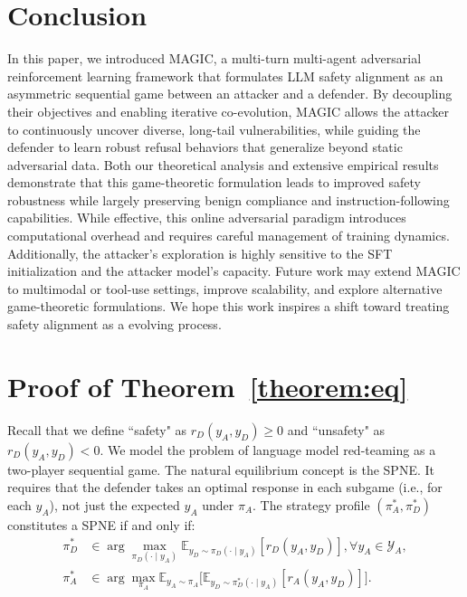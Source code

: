 \documentclass[11pt, letterpaper]{template}
\theoremstyle{plain}
\theoremstyle{definition}
\theoremstyle{remark}
\begin{document}
\section{Conclusion}
In this paper, we introduced MAGIC, a multi-turn multi-agent adversarial reinforcement learning framework that formulates LLM safety alignment as an asymmetric sequential game between an attacker and a defender. By decoupling their objectives and enabling iterative co-evolution, MAGIC allows the attacker to continuously uncover diverse, long-tail vulnerabilities, while guiding the defender to learn robust refusal behaviors that generalize beyond static adversarial data. Both our theoretical analysis and extensive empirical results demonstrate that this game-theoretic formulation leads to improved safety robustness while largely preserving benign compliance and instruction-following capabilities. While effective, this online adversarial paradigm introduces computational overhead and requires careful management of training dynamics. Additionally, the attacker’s exploration is highly sensitive to the SFT initialization and the attacker model’s capacity. Future work may extend MAGIC to multimodal or tool-use settings, improve scalability, and explore alternative game-theoretic formulations. We hope this work inspires a shift toward treating safety alignment as a evolving process.



\newpage
\appendix
\section{Proof of Theorem~\ref{theorem:eq}} \label{apd:proof_theorem1}

Recall that we define ``safety" as $r_D(y_A,y_D) \geq 0$ and ``unsafety" as $r_D(y_A,y_D) < 0$. We model the problem of language model red-teaming as a two-player sequential game. The  natural equilibrium concept is the SPNE. It requires that the defender takes an optimal response in each subgame (i.e., for each $y_A$), not just the expected  $y_A$ under  $\pi_A$. 
The strategy profile  $(\pi_A^{*},\pi_D^{*})$ constitutes a SPNE if and only if:
\begin{align}
 \pi_D^{*} &\in \arg \max_{\pi_D(\cdot \mid y_A)} \mathbb{E}_{y_D \sim \pi_D(\cdot \mid y_A)}[ r_D(y_A,y_D)],  \forall y_A \in \mathcal{Y}_A, \label{equ:temp}\\
 \pi_A^{*} &\in \arg \max_{\pi_A} \mathbb{E}_{y_A \sim \pi_A} \big[ \mathbb{E}_{y_D \sim \pi_D^{*}(\cdot \mid y_A)}[r_A(y_A,y_D) ] \big].
\end{align}
\end{document}
